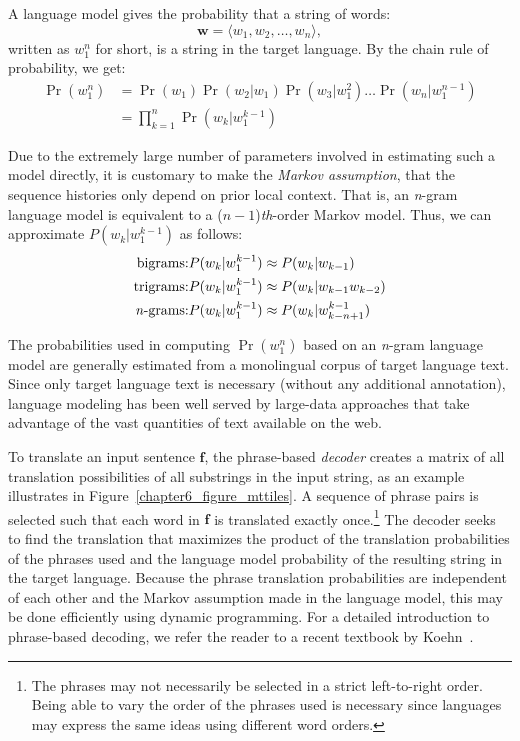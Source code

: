 A language model gives the probability that a string of words:
\begin{displaymath}
\textbf{w} = \langle w_1, w_2, \ldots , w_{n} \rangle, 
\end{displaymath}
written as
$w_{1}^{n}$ for short, is a string in the target language.  By the
chain rule of probability, we get:
\begin{align}
\Pr(w_{1}^{n}) &= \Pr(w_1) \Pr(w_2|w_1) \Pr(w_3|w_1^2) \ldots \Pr(w_n|w_1^{n-1}) \\
              &= \prod_{k=1}^{n} \Pr(w_k|w_1^{k-1})
\end{align}

\noindent Due to the extremely large number of parameters involved in
estimating such a model directly, it is customary to make the \emph{
  Markov assumption}, that the sequence histories only depend on prior
local context.  That is, an \emph{n}-gram language model is equivalent
to a ($n-1$)\emph{th}-order Markov model.  Thus, we can approximate
$P(w_k|w_1^{k-1})$ as follows:
\begin{align}
\textrm{bigrams:} & P(w_k|w_1^{k-1}) \approx P(w_k|w_{k-1}) \\
\textrm{trigrams:} & P(w_k|w_1^{k-1}) \approx P(w_k|w_{k-1} w_{k-2}) \\
\textrm{\emph{n}-grams:} & P(w_k|w_1^{k-1}) \approx  P(w_k|w_{k-n+1}^{k-1})
\end{align}

\noindent The probabilities used in computing $\Pr(w_{1}^{n})$ based
on an \emph{n}-gram language model are generally estimated from a
monolingual corpus of target language text.  Since only target
language text is necessary (without any additional annotation),
language modeling has been well served by large-data approaches that
take advantage of the vast quantities of text available on the web.

To translate an input sentence $\textbf{f}$, the phrase-based
\emph{decoder} creates a matrix of all translation possibilities of
all substrings in the input string, as an example illustrates in
Figure~\ref{chapter6_figure_mttiles}.  A sequence of phrase pairs is
selected such that each word in $\textbf{f}$ is translated exactly
once.\footnote{The phrases may not necessarily be selected in a strict
  left-to-right order.  Being able to vary the order of the phrases
  used is necessary since languages may express the same ideas using
  different word orders.}  The decoder seeks to find the translation
that maximizes the product of the translation probabilities of the
phrases used and the language model probability of the resulting
string in the target language.  Because the phrase translation
probabilities are independent of each other and the Markov assumption
made in the language model, this may be done efficiently using dynamic
programming.  For a detailed introduction to phrase-based decoding, we
refer the reader to a recent textbook by Koehn~\cite{Koehn_2009}.

